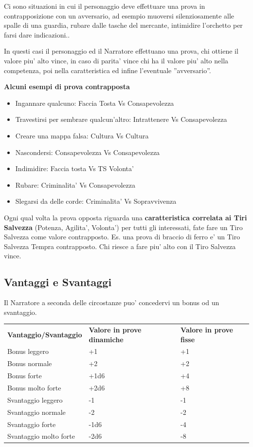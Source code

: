 \documentclass[a4paper,11pt,twoside,openany]{book}
\begin{document}
	Ci sono situazioni in cui il personaggio deve effettuare una prova in contrapposizione con un avversario, ad esempio muoversi silenziosamente alle spalle di una guardia, rubare dalle tasche del mercante, intimidire l'orchetto per farsi dare indicazioni..
	
	In questi casi il personaggio ed il Narratore effettuano una prova, chi ottiene il valore piu' alto vince, in caso di parita' vince chi ha il valore piu' alto nella competenza, poi nella caratteristica ed infine l'eventuale ''avversario''.
	
	\bigskip
	
	\textbf{Alcuni esempi di prova contrapposta}
	
	\begin{itemize}
		\item Ingannare qualcuno: Faccia Tosta Vs Consapevolezza
		\item Travestirsi per sembrare qualcun'altro: Intrattenere Vs Consapevolezza
		\item Creare una mappa falsa: Cultura Vs Cultura
		\item Nascondersi: Consapevolezza Vs Consapevolezza
		\item Indimidire: Faccia tosta Vs TS Volonta'
		\item Rubare: Criminalita' Vs Consapevolezza
		\item Slegarsi da delle corde: Criminalita' Vs Sopravvivenza
	\end{itemize}
	
	Ogni qual volta la prova opposta riguarda una \textbf{caratteristica correlata ai Tiri Salvezza} (Potenza, Agilita', Volonta') per tutti gli interessati, fate fare un Tiro Salvezza come valore contrapposto. Es. una prova di braccio di ferro e' un Tiro Salvezza Tempra contrapposto. Chi riesce a fare piu' alto con il Tiro Salvezza vince.
	
	\bigskip
	
	\subsection{Vantaggi e Svantaggi}
	
	Il Narratore a seconda delle circostanze puo' concedervi un bonus od un svantaggio.
	
	\bigskip
	
	\begin{tabular}{lll}
		\toprule
		\textbf{Vantaggio/Svantaggio} & \textbf{Valore in prove dinamiche} & \textbf{Valore in prove fisse}\tabularnewline
		Bonus leggero & +1 & +1\tabularnewline
		Bonus normale & +2 & +2\tabularnewline
		Bonus forte & +1d6 & +4\tabularnewline
		Bonus molto forte & +2d6 & +8\tabularnewline
		Svantaggio leggero & -1 & -1\tabularnewline
		Svantaggio normale & -2 & -2\tabularnewline
		Svantaggio forte & -1d6 & -4\tabularnewline
		Svantaggio molto forte & -2d6 & -8\tabularnewline
		
	\end{tabular}
	
\end{document}
